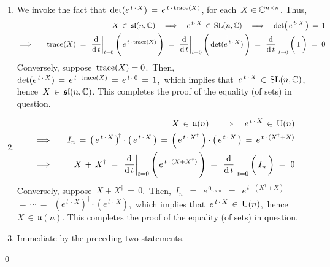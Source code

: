 \begin{enumerate}
\item
	We invoke the fact that \,$\det(e^{\,t\,\cdot\,X}) \,=\, e^{\,t\,\cdot\,\textnormal{trace}(X)}$,
	for each \,$X \in \mathbb{C}^{n \times n}$.
	Thus,
	\begin{eqnarray*}
	&&
		X \,\in\, \mathfrak{sl}(n,\C)
		\quad\Longrightarrow\quad
		e^{\,t\cdot\,X} \,\in\, \textnormal{SL}(n,\C)
		\quad\Longrightarrow\quad
		\det\!\left(\,e^{\,t\cdot\,X}\,\right) \,=\, 1
	\\
	& \Longrightarrow\quad &
		\textnormal{trace}(X)
		\; = \;
			\left.\dfrac{\d}{\d\,t}\right\vert_{t=0}\left(\,\overset{{\color{white}1}}{e^{\,t\,\cdot\,\textnormal{trace}(X)}}\,\right)
		\; = \;
			\left.\dfrac{\d}{\d\,t}\right\vert_{t=0}\left(\,\overset{{\color{white}1}}{\det(e^{\,t\,\cdot\,X})}\,\right)
		\; = \;
			\left.\dfrac{\d}{\d\,t}\right\vert_{t=0}\left(\,\overset{{\color{white}1}}{1}\,\right)
		\; = \;
			0
	\end{eqnarray*}
	Conversely, suppose \,$\textnormal{trace}(X) = 0$.\,
	Then, \,$\det(e^{\,t\,\cdot\,X}) \,=\, e^{\,t\,\cdot\,\textnormal{trace}(X)} \,=\, e^{\,t\,\cdot\,0} \,=\, 1$,\,
	which implies that \,$e^{\,t\,\cdot\,X} \,\in\, \textnormal{SL}(n,\mathbb{C})$,\, hence \,$X \,\in\, \mathfrak{sl}(n,\mathbb{C})$.
	This completes the proof of the equality (of sets) in question.
\item
	\begin{eqnarray*}
	&&
		X \,\in\, \mathfrak{u}(n)
		\quad\Longrightarrow\quad
		e^{\,t\,\cdot\,X} \,\in\, \textnormal{U}(n)
	\\
	& \Longrightarrow\quad &
		I_{n}
			\,=\, \left(\,e^{\,t\,\cdot\,X}\,\right)^{\!\dagger} \cdot \left(\,e^{\,t\,\cdot\,X}\,\right)
			\,=\, \left(\,e^{\,t\,\cdot\,X^{\dagger}}\,\right) \cdot \left(\,e^{\,t\,\cdot\,X}\,\right)
			\,=\, e^{\,t\,\cdot\,(X^{\dagger}+X)}
	\\
	& \Longrightarrow\quad &
		X \,+\, X^{\dagger}
		\; = \;
			\left.\dfrac{\d}{\d\,t}\right\vert_{t=0}\left(\,\overset{{\color{white}1}}{e^{\,t\,\cdot\,(X+X^{\dagger})}}\,\right)
		\; = \;
			\left.\dfrac{\d}{\d\,t}\right\vert_{t=0}\left(\,\overset{{\color{white}1}}{I_{n}}\,\right)
		\; = \;
			0
	\end{eqnarray*}
	Conversely, suppose \,$X + X^{\dagger} \,=\, 0$.\,
	Then, \,$I_{n}$
	\,$=$\, $e^{\,0_{n \times n}}$
	\,$=$\, $e^{\,t\,\cdot(X^{\dagger}+X)}$
	\,$=\, \cdots \,=$\, $\left(e^{\,t\,\cdot\,X}\right)^{\!\dagger}\cdot\left(e^{\,t\,\cdot\,X}\right)$,\,
	which implies that \,$e^{\,t\,\cdot\,X} \,\in\, \textnormal{U}(n)$,\, hence \,$X \,\in\, \mathfrak{u}(n)$.
	This completes the proof of the equality (of sets) in question.
\item
	Immediate by the preceding two statements.
\end{enumerate}
\qed

